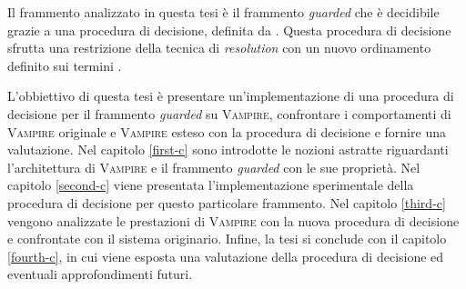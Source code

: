 Il frammento analizzato in questa tesi è il frammento \emph{guarded} che è decidibile grazie a una procedura di decisione, 
definita da \citeauthor{de2003deciding}. Questa procedura di decisione sfrutta una restrizione della tecnica di \emph{resolution}
con un nuovo ordinamento definito sui termini \cite{de2003deciding}.  

L'obbiettivo di questa tesi è presentare un'implementazione di una procedura di decisione per il frammento \emph{guarded} su   
\textsc{Vampire}, confrontare i comportamenti di \textsc{Vampire} originale e \textsc{Vampire} esteso con la procedura di decisione e 
fornire una valutazione.  
Nel capitolo \ref{first-c} sono introdotte le nozioni astratte 
riguardanti l'architettura di \textsc{Vampire} e il frammento \emph{guarded} con le sue proprietà.
Nel capitolo \ref{second-c} viene presentata l'implementazione sperimentale 
della procedura di decisione per questo particolare frammento. 
Nel capitolo \ref{third-c} vengono analizzate le prestazioni di \textsc{Vampire} 
con la nuova procedura di decisione e confrontate con il sistema originario. 
Infine, la tesi si conclude con il capitolo \ref{fourth-c}, in cui viene esposta 
una valutazione della procedura di decisione ed eventuali approfondimenti futuri.
